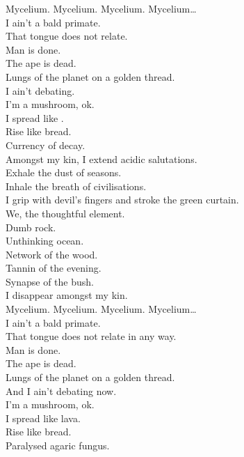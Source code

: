 
\label{album:ice-death-planets-mushrooms-lava}




Mycelium. Mycelium. Mycelium. Mycelium… \\

I ain't a bald primate. \\
That tongue does not relate. \\
Man is done. \\
The ape is dead. \\
Lungs of the planet on a golden thread. \\
I ain't debating. \\
I'm a mushroom, ok. \\
I spread like . \\
Rise like bread. \\
Currency of decay. \\
Amongst my kin, I extend acidic salutations. \\
Exhale the dust of seasons. \\
Inhale the breath of civilisations. \\
I grip with devil's fingers and stroke the green curtain. \\
We, the thoughtful element. \\
Dumb rock. \\
Unthinking ocean. \\
Network of the wood. \\
Tannin of the evening. \\
Synapse of the bush. \\
I disappear amongst my kin. \\

Mycelium. Mycelium. Mycelium. Mycelium… \\

I ain't a bald primate. \\
That tongue does not relate in any way. \\
Man is done. \\
The ape is dead. \\
Lungs of the planet on a golden thread. \\
And I ain't debating now. \\
I'm a mushroom, ok. \\
I spread like lava. \\
Rise like bread. \\
Paralysed agaric fungus. \\


